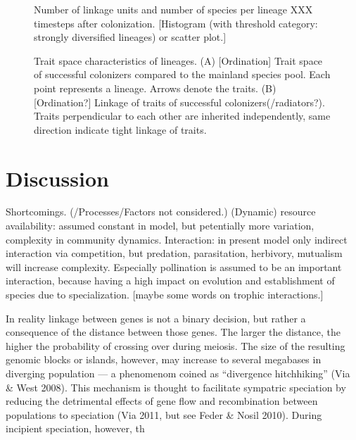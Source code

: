 \documentclass[a4paper]{scrartcl}
\begin{document}
\begin{figure}
  \caption{Number of linkage units and number of species per lineage XXX timesteps after colonization.
    [Histogram (with threshold category: strongly diversified lineages) or scatter plot.]}
  \label{specieslinkage}
\end{figure}

\begin{figure}
  \caption{Trait space characteristics of lineages.
    (A) [Ordination] Trait space of successful colonizers compared to the mainland species pool. Each point represents a lineage.
    Arrows denote the traits.
    (B) [Ordination?] Linkage of traits of successful colonizers(/radiators?). Traits perpendicular to each other are inherited independently,
  same direction indicate tight linkage of traits.}
  \label{traitspace}
\end{figure}


\section{Discussion}
Shortcomings. (/Processes/Factors not considered.)
(Dynamic) resource availability: assumed constant in model, but petentially more variation, complexity in community dynamics.
Interaction: in present model only indirect interaction via competition, but predation, parasitation, herbivory, mutualism will increase complexity.
Especially pollination is assumed to be an important interaction, because having a high impact on evolution and establishment of species due to specialization.
[maybe some words on trophic interactions.]

In reality linkage between genes is not a binary decision, but rather a consequence of the distance between those genes.
The larger the distance, the higher the probability of crossing over during meiosis.
The size of the resulting genomic blocks or islands, however, may increase to several megabases in diverging population ---
a phenomenom coined as ``divergence hitchhiking'' (Via \& West 2008). %
This mechanism is thought to facilitate sympatric speciation by reducing the detrimental effects of gene flow and
recombination between populations to speciation (Via 2011, but see Feder \& Nosil 2010).
During incipient speciation, however, th


\printbibliography
\end{document}
